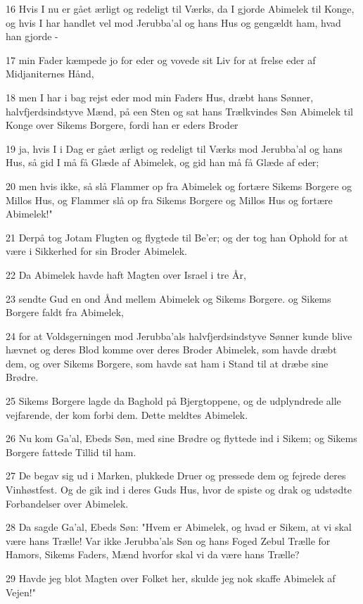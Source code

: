 \par 16 Hvis I nu er gået ærligt og redeligt til Værks, da I gjorde Abimelek til Konge, og hvis I har handlet vel mod Jerubba'al og hans Hus og gengældt ham, hvad han gjorde -
\par 17 min Fader kæmpede jo for eder og vovede sit Liv for at frelse eder af Midjaniternes Hånd,
\par 18 men I har i bag rejst eder mod min Faders Hus, dræbt hans Sønner, halvfjerdsindstyve Mænd, på een Sten og sat hans Trælkvindes Søn Abimelek til Konge over Sikems Borgere, fordi han er eders Broder
\par 19 ja, hvis I i Dag er gået ærligt og redeligt til Værks mod Jerubba'al og hans Hus, så gid I må få Glæde af Abimelek, og gid han må få Glæde af eder;
\par 20 men hvis ikke, så slå Flammer op fra Abimelek og fortære Sikems Borgere og Millos Hus, og Flammer slå op fra Sikems Borgere og Millos Hus og fortære Abimelek!"
\par 21 Derpå tog Jotam Flugten og flygtede til Be'er; og der tog han Ophold for at være i Sikkerhed for sin Broder Abimelek.
\par 22 Da Abimelek havde haft Magten over Israel i tre År,
\par 23 sendte Gud en ond Ånd mellem Abimelek og Sikems Borgere. og Sikems Borgere faldt fra Abimelek,
\par 24 for at Voldsgerningen mod Jerubba'als halvfjerdsindstyve Sønner kunde blive hævnet og deres Blod komme over deres Broder Abimelek, som havde dræbt dem, og over Sikems Borgere, som havde sat ham i Stand til at dræbe sine Brødre.
\par 25 Sikems Borgere lagde da Baghold på Bjergtoppene, og de udplyndrede alle vejfarende, der kom forbi dem. Dette meldtes Abimelek.
\par 26 Nu kom Ga'al, Ebeds Søn, med sine Brødre og flyttede ind i Sikem; og Sikems Borgere fattede Tillid til ham.
\par 27 De begav sig ud i Marken, plukkede Druer og pressede dem og fejrede deres Vinhøstfest. Og de gik ind i deres Guds Hus, hvor de spiste og drak og udstødte Forbandelser over Abimelek.
\par 28 Da sagde Ga'al, Ebeds Søn: "Hvem er Abimelek, og hvad er Sikem, at vi skal være hans Trælle! Var ikke Jerubba'als Søn og hans Foged Zebul Trælle for Hamors, Sikems Faders, Mænd hvorfor skal vi da være hans Trælle?
\par 29 Havde jeg blot Magten over Folket her, skulde jeg nok skaffe Abimelek af Vejen!"
